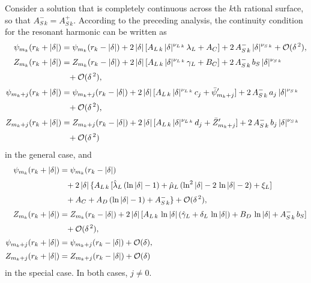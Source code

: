 \documentclass[12pt,prb,aps]{revtex4-1}
\begin{document}
Consider a solution that is completely continuous across the $k$th rational surface, so that $A_{S\,k}^-=A_{S\,k}^+$. According to the
preceding analysis, the continuity condition for the resonant harmonic can be written as
\begin{align}\label{c1}
\psi_{m_k}(r_k+|\delta|) &= \psi_{m_k}(r_k-|\delta|) + 2\,|\delta|\,[A_{L\,k}\,|\delta|^{\nu_{L\,k}}\,\lambda_L + A_C] + 2\,A_{S\,k}^-\,|\delta|^{\nu_{S\,k}}+ {\cal O}(\delta^{\,2}),\\[0.5ex]
Z_{m_k} (r_k+|\delta|) &=  Z_{m_k}(r_k-|\delta|) + 2\,|\delta|\,[A_{L\,k}\,|\delta|^{\nu_{L\,k}}\,\gamma_L + B_C] + 2\,A_{S\,k}^-\,b_S\,|\delta|^{\nu_{S\,k}} 
\nonumber\\[0.5ex]&\phantom{=}+ {\cal O}(\delta^{\,2}),\\[0.5ex]
\psi_{m_k+j}(r_k+|\delta|) &= \psi_{m_k+j}(r_k-|\delta|) +2\,|\delta|\,[A_{L\,k}\,|\delta|^{\nu_{L\,k}}\,c_j + \bar{\psi}_{m_k+j}'] + 2\,A_{S\,k}^-\,a_j\,|\delta|^{\nu_{S\,k}}\nonumber\\[0.5ex]&\phantom{=} +{\cal O}(\delta^{\,2}),\\[0.5ex]
Z_{m_k+j}(r_k+|\delta|) &= Z_{m_k+j}(r_k-|\delta|) +2\,|\delta|\,[A_{L\,k}\,|\delta|^{\nu_{L\,k}}\,d_j + \bar{Z}_{m_k+j}'] + 2\,A_{S\,k}^-\,b_j\,|\delta|^{\nu_{S\,k}}
\nonumber\\[0.5ex]&\phantom{=}+ {\cal O}(\delta^{\,2})
\end{align}
in the general case, and 
\begin{align}
\psi_{m_k}(r_k+|\delta|) &= \psi_{m_k}(r_k-|\delta|) \nonumber\\[0.5ex]
&\phantom{=}+ 2\,|\delta|\,\{A_{L\,k}\,[\hat{\lambda}_L\,(\ln|\delta|-1)+\hat{\mu}_L\,(\ln^2|\delta|-2\,\ln|\delta|-2)+ \xi_L]\nonumber\\[0.5ex]
&\phantom{=}+ A_C
+A_D\,(\ln|\delta|-1) + A_{S\,k}^-\}+ {\cal O}(\delta^{\,2}),\\[0.5ex]
Z_{m_k} (r_k+|\delta|) &=  Z_{m_k}(r_k-|\delta|) + 2\,|\delta|\,[A_{L\,k}\,\ln|\delta| \,(\hat{\gamma}_L+\delta_L\,\ln|\delta|)+ B_D\,\ln|\delta|
+A_{S\,k}^-\,b_{S}]\nonumber\\[0.5ex]&\phantom{=}+ {\cal O}(\delta^{\,2}),\\[0.5ex]
\psi_{m_k+j}(r_k+|\delta|) &= \psi_{m_k+j}(r_k-|\delta|)+{\cal O}(\delta),\\[0.5ex]
Z_{m_k+j}(r_k+|\delta|) &= Z_{m_k+j}(r_k-|\delta|)+{\cal O}(\delta)\label{c2}
\end{align}
in the special case. In both cases, $j\neq 0$.
\end{document}
